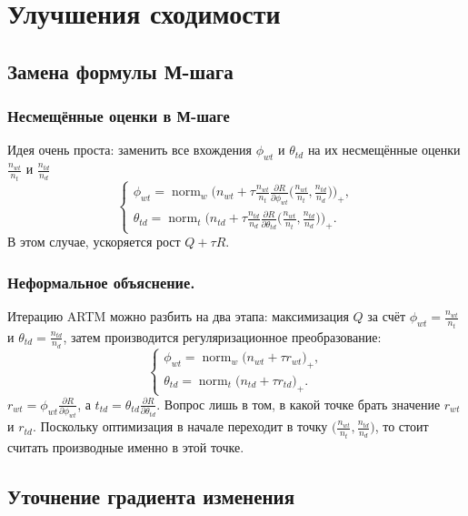 \documentclass[utf8]{beamer}
\DeclareMathOperator{\norm}{norm}
\begin{document}
	\section{Улучшения сходимости}
	\subsection{Замена формулы М-шага}
	
	\begin{frame}
		\frametitle{Несмещённые оценки в  М-шаге}
Идея очень проста: заменить все вхождения $\phi_{wt}$ и $\theta_{td}$ на их несмещённые оценки $\frac{n_{wt}}{n_t}$ и $\frac{n_{td}}{n_d}$
\[
\left\{
	\begin{aligned}
		\phi_{wt} = \norm_w \bigg( n_{wt} + \tau \frac{n_{wt}}{n_t} \frac{\partial{R}}{\partial{\phi_{wt}}} \big(\frac{n_{wt}}{n_t}, \frac{n_{td}}{n_d}\big) \bigg)_{+},\\
		\theta_{td} = \norm_t \bigg(n_{td} + \tau \frac{n_{td}}{n_d} \frac{\partial{R}}{\partial{\theta_{td}}} \big(\frac{n_{wt}}{n_t}, \frac{n_{td}}{n_d}\big) \bigg)_{+}.
	\end{aligned}
\right.
\]
В этом случае, ускоряется рост $Q + \tau R$.\\
	\end{frame}

\begin{frame}
		\frametitle{Неформальное объяснение.}
Итерацию ARTM можно разбить на два этапа: максимизация $Q$ за счёт $\phi_{wt} = \frac{n_{wt}}{n_t}$ и $\theta_{td} = \frac{n_{td}}{n_d}$, затем производится регуляризационное преобразование:
\[
\left\{
	\begin{aligned}
		\phi_{wt} = \norm_w \bigg( n_{wt} + \tau r_{wt}\bigg)_{+},\\
		\theta_{td} = \norm_t \bigg( n_{td} + \tau r_{td}\bigg)_{+}.
	\end{aligned}
\right.
\]
$ r_{wt} = \phi_{wt}  \frac{\partial{R}}{\partial{\phi_{wt}}}$, а $t_{td} = \theta_{td}  \frac{\partial{R}}{\partial{\theta_{td}}}$. Вопрос лишь в том, в какой точке брать значение $r_{wt}$ и $r_{td}$. Поскольку оптимизация в начале переходит в точку $\bigg( \frac{n_{wt}}{n_t}, \frac{n_{td}}{n_d}\bigg)$, то стоит считать производные именно в этой точке.
	\end{frame}

	\subsection{Уточнение градиента изменения}
	
\end{document}
